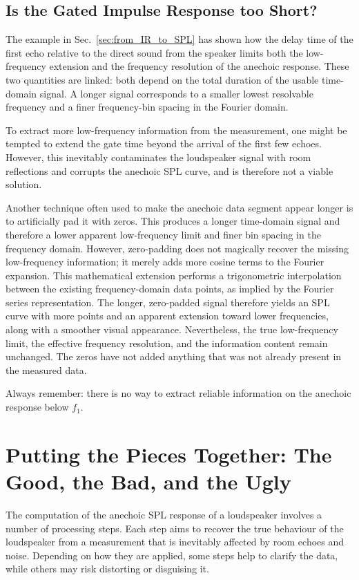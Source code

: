 \documentclass[12pt,a4paper]{article}
\providecommand{\seclabel}[1]{\label{sec:#1}}
\providecommand{\secn}[1]{Sec.~\ref{sec:#1}}
\begin{document}
\subsection{Is the Gated Impulse Response too Short?}\seclabel{zeropadding}

The example in \secn{from_IR_to_SPL} has shown how the delay time of the first echo relative to the direct sound from the speaker limits both the low-frequency extension and the frequency resolution of the anechoic response. These two quantities are linked: both depend on the total duration of the usable time-domain signal. A longer signal corresponds to a smaller lowest resolvable frequency and a finer frequency-bin spacing in the Fourier domain.

To extract more low-frequency information from the measurement, one might be tempted to extend the gate time beyond the arrival of the first few echoes. However, this inevitably contaminates the loudspeaker signal with room reflections and corrupts the anechoic SPL curve, and is therefore not a viable solution.

Another technique often used to make the anechoic data segment appear longer is to artificially pad it with zeros. This produces a longer time-domain signal and therefore a lower apparent low-frequency limit and finer bin spacing in the frequency domain. However, zero-padding does not magically recover the missing low-frequency information; it merely adds more cosine terms to the Fourier expansion. This mathematical extension performs a trigonometric interpolation between the existing frequency-domain data points, as implied by the Fourier series representation. The longer, zero-padded signal therefore yields an SPL curve with more points and an apparent extension toward lower frequencies, along with a smoother visual appearance. Nevertheless, the true low-frequency limit, the effective frequency resolution, and the information content remain unchanged. The zeros have not added anything that was not already present in the measured data.

Always remember: there is no way to extract reliable information on the anechoic response below $f_1$.


\section{Putting the Pieces Together: The Good, the Bad, and the Ugly}\seclabel{putting_pieces_together}

The computation of the anechoic SPL response of a loudspeaker involves a number of processing steps. Each step aims to recover the true behaviour of the loudspeaker from a measurement that is inevitably affected by room echoes and noise. Depending on how they are applied, some steps help to clarify the data, while others may risk distorting or disguising it.
\end{document}
